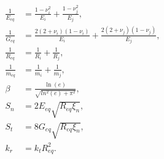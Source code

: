 \begin{equation}
\begin{aligned}
 \frac{1}{E_{eq}} & = \frac{1-\nu_i^2}{E_i} + \frac{1-\nu_j^2}{E_j} ,\\
 \frac{1}{G_{eq}} & = \frac{2(2+\nu_i)(1-\nu_i)}{E_i} + \frac{2(2+\nu_j)(1-\nu_j)}{E_j} ,\\
 \frac{1}{R_{eq}} &= \frac{1}{R_i} + \frac{1}{R_j} ,\\
 \frac{1}{m_{eq}} &= \frac{1}{m_i} + \frac{1}{m_j} ,\\
 \beta & = \frac{\ln(e)}{\sqrt{ln^2(e)+\pi^2}} ,\\
 S_n & = 2 E_{eq} \sqrt{R_{eq} \xi_n} ,\\
 S_t & = 8 G_{eq} \sqrt{R_{eq} \xi_n} ,\\
 k_r & = k_t R_{eq}^2 .\\
\end{aligned}
\label{eq:equivProp2}
\end{equation}


